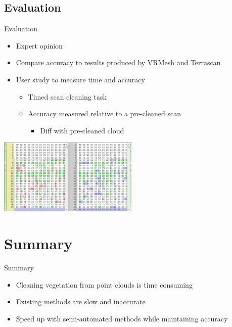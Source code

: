 \documentclass{beamer}
\begin{document}
\subsection{Evaluation}

\begin{frame}{Evaluation}
	\begin{itemize}
		\item Expert opinion
		\item Compare accuracy to results produced by VRMesh and Terrascan
		\item User study to measure time and accuracy
		\begin{itemize}
			\item Timed scan cleaning task
			\item Accuracy measured relative to a pre-cleaned scan
			\begin{itemize}
				\item Diff with pre-cleaned cloud
			\end{itemize}
		\end{itemize}
	\end{itemize}

\centering
\includegraphics[width=0.5\textwidth]{pics/diff.png}

\end{frame}

\section*{Summary}

\begin{frame}{Summary}

  \begin{itemize}
  \item
    Cleaning vegetation from point clouds is time consuming
  \item
  	Existing methods are slow and inaccurate
  \item
    Speed up with semi-automated methods while maintaining accuracy
  \end{itemize}
  
\end{frame}
\end{document}
